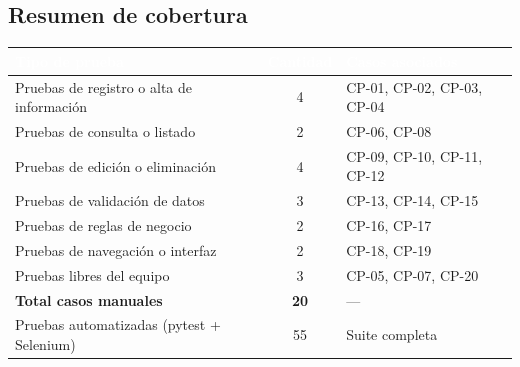 \documentclass[11pt,letterpaper]{article}
\newcommand{\headrowcolor}{\rowcolor{azulUAZ}}
\newcommand{\headcell}[1]{\textcolor{white}{\textbf{#1}}}
\begin{document}
	\subsection{Resumen de cobertura}
	\begin{center}\small
		\begin{tabularx}{\linewidth}{|X|c|p{4.5cm}|}
			\hline
			\headrowcolor \headcell{Tipo de prueba} & \headcell{Cantidad} & \headcell{Casos asociados} \\ \hline
			Pruebas de registro o alta de informaci\'on & 4 & CP-01, CP-02, CP-03, CP-04 \\ \hline
			\rowcolor{grisAlt}
			Pruebas de consulta o listado & 2 & CP-06, CP-08 \\ \hline
			Pruebas de edici\'on o eliminaci\'on & 4 & CP-09, CP-10, CP-11, CP-12 \\ \hline
			\rowcolor{grisAlt}
			Pruebas de validaci\'on de datos & 3 & CP-13, CP-14, CP-15 \\ \hline
			Pruebas de reglas de negocio & 2 & CP-16, CP-17 \\ \hline
			\rowcolor{grisAlt}
			Pruebas de navegaci\'on o interfaz & 2 & CP-18, CP-19 \\ \hline
			Pruebas libres del equipo & 3 & CP-05, CP-07, CP-20 \\ \hline
			\rowcolor{grisAlt}
			\textbf{Total casos manuales} & \textbf{20} & --- \\ \hline
			Pruebas automatizadas (pytest + Selenium) & 55 & Suite completa \\ \hline
		\end{tabularx}
	\end{center}
	
\end{document}
